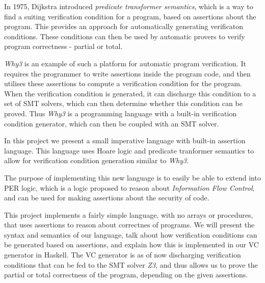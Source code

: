 In 1975, Dijkstra introduced \textit{predicate transformer semantics}, which is a way to find a suiting verification condition for a program, based on assertions about the program\cite{Dijkstra}.
This provides an approach for automatically generating verificaton conditions.
These conditions can then be used by automatic provers to verify program correctness - partial or total.


\textit{Why3} is an example of such a platform for automatic program verification. It requires the programmer to write assertions inside the program code, and then utilises these assertions to compute a verification condition for the program.
When the verification condition is generated, it can discharge this condition to a set of SMT solvers, which can then determine whether this condition can be proved.
Thus \textit{Why3} is a programming language with a built-in verification condition generator, which can then be coupled with an SMT solver.

In this project we present a small imperative language with built-in assertion language.
This language uses Hoare logic and predicate tranformer semantics to allow for verification condition generation similar to \textit{Why3}. %

The purpose of implementing this new language is to easily be able to extend into PER logic, which is a logic proposed to reason about \textit{Information Flow Control}, and can be used for making assertions about the security of code.

This project implements a fairly simple language, with no arrays or procedures, that uses assertions to reason about correctnes of programs.
We will present the syntax and semantics of our language, talk about how verification conditions can be generated based on assertions, and explain how this is implemented in our VC generator in Haskell. 
The VC generator is as of now discharging verification conditions that can be fed to the SMT solver \textit{Z3}, and thus allows us to prove the partial or total correctness of the program, depending on the given assertions.


















